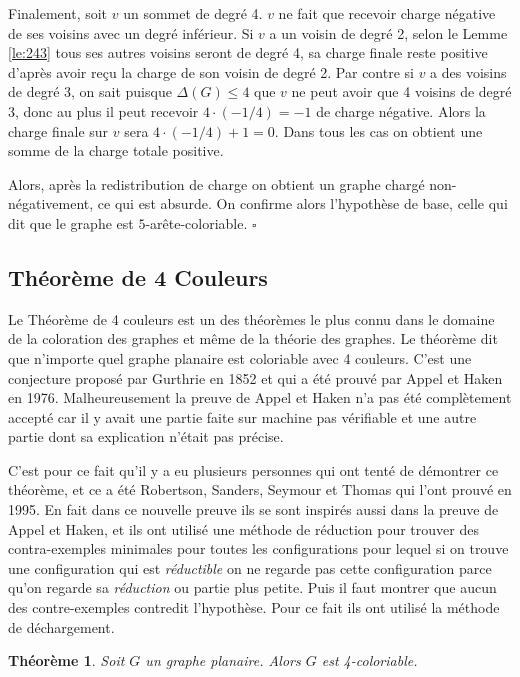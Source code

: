 \documentclass[10pt,a4paper]{article}
\newtheorem{theorem}{Théorème}
\newcommand{\ep}{{\hfill $\square$}}
\begin{document}
Finalement, soit $v$ un sommet de degré 4. $v$ ne fait que recevoir charge négative de ses voisins avec un degré inférieur. Si $v$ a un voisin de degré 2, selon le Lemme \ref{le:243} tous ses autres voisins seront de degré 4, sa charge finale reste positive d'après avoir reçu la charge de son voisin de degré 2. Par contre si $v$ a des voisins de degré 3, on sait puisque $\Delta(G)\leq 4$ que $v$ ne peut avoir que 4 voisins de degré 3, donc au plus il peut recevoir $4 \cdot (-1/4)=-1$ de charge négative. Alors la charge finale sur $v$ sera $4\cdot(-1/4) + 1 = 0$. Dans tous les cas on obtient une somme de la charge totale positive.

Alors, après la redistribution de charge on obtient un graphe chargé non-négativement, ce qui est absurde. On confirme alors l'hypothèse de base, celle qui dit que le graphe est $5$-arête-coloriable.
\ep 


\subsection{Théorème de 4 Couleurs}

Le Théorème de 4 couleurs est un des théorèmes le plus connu dans le domaine de la coloration des graphes et même de la théorie des graphes. Le théorème dit que n'importe quel graphe planaire est coloriable avec 4 couleurs. C'est une conjecture proposé par Gurthrie en 1852 et qui a été prouvé par Appel et Haken en 1976. Malheureusement la preuve de Appel et Haken n'a pas été complètement accepté car il y avait une partie faite sur machine pas vérifiable et une autre partie dont sa explication n'était pas précise.

C'est pour ce fait qu'il y a eu plusieurs personnes qui ont tenté de démontrer ce théorème, et ce a été Robertson, Sanders, Seymour et Thomas qui l'ont prouvé en 1995. En fait dans ce nouvelle preuve ils se sont inspirés aussi dans la preuve de Appel et Haken, et ils ont utilisé une méthode de réduction pour trouver des contra-exemples minimales pour toutes les configurations pour lequel si on trouve une configuration qui est \emph{réductible} on ne regarde pas cette configuration parce qu'on regarde sa \emph{réduction} ou partie plus petite. Puis il faut montrer que aucun des contre-exemples contredit l'hypothèse. Pour ce fait ils ont utilisé la méthode de déchargement. 

\begin{theorem}
Soit $G$ un graphe planaire. Alors $G$ est 4-coloriable.
\label{th:4CT}
\end{theorem}
\end{document}

